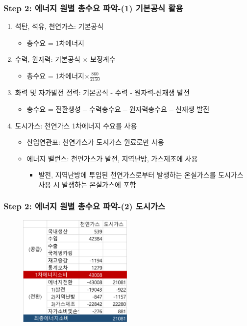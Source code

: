 \documentclass[10pt,compress,slidetop,%
			   hyperref={unicode},xcolor={svgnames},%
			   t]{beamer}
\begin{document}
\begin{frame}
	\frametitle{Step 2: 에너지 원별 총수요 파악-(1) 기본공식 활용}
\begin{enumerate}
\item{석탄, 석유, 천연가스: 기본공식}
\begin{itemize}
\item{총수요 = 1차에너지}
\end{itemize}
\smallskip

\item{수력, 원자력: 기본공식 $\times$ 보정계수}
\begin{itemize}
\item{총수요 = 1차에너지$\times\frac{860}{2150}$}
\end{itemize}
\smallskip

\item{화력 및 자가발전 전력: 기본공식 - 수력 - 원자력-신재생 발전}
\begin{itemize}
\item{총수요 = $\mbox{전환생성}-\mbox{수력총수요}-\mbox{원자력총수요}-\mbox{신재생 발전}$}
\end{itemize}
\smallskip

\item{도시가스: 천연가스 1차에너지 수요를 사용}
\begin{itemize}
\item{산업연관표: 천연가스가 도시가스 원료로만 사용}
\item{에너지 밸런스: 천연가스가 발전, 지역난방, 가스제조에 사용 }
\begin{itemize}
\item{발전, 지역난방에 투입된 천연가스로부터 발생하는 온실가스를 도시가스 사용 시 발생하는 온실가스에 포함}
\end{itemize}
\end{itemize}

\end{enumerate} 	
\end{frame}
% 
%
\begin{frame}
	\frametitle{Step 2: 에너지 원별 총수요 파악-(2) 도시가스}
  	\begin{figure}
	\centering
	 \includegraphics[width=0.5\textwidth]{Citigas.png}
	\end{figure}	

	
\end{frame}
\end{document}
